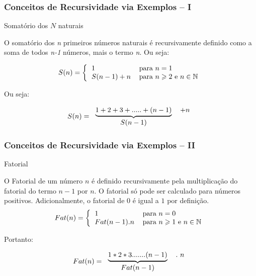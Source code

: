 \begin{frame}[fragile]

\frametitle{Conceitos de Recursividade via Exemplos -- I}

\begin{block}{Somatório dos $N$ naturais}

 O somatório dos \emph{n}  primeiros  números naturais é recursivamente 
 definido como a soma de todos \emph{n-1} números, mais o termo \emph{n}. 
 Ou seja:

    \[
    S(n)=\left \{
    \begin{tabular}
        [c]{ll}
        $1$ & para $n=1$ \\
        $S(n-1) + n $ & para $n \geqslant 2$ e $n \in \mathbb{N}$
    \end{tabular}
    \right.
    \]
    
    Ou seja:
    
    \[
    S(n)=
    \begin{tabular}[c]{cc}
        $\underbrace{1+2+3+.....+(n-1)}$ &  $  + n$\\
        $S(n-1)$ &
    \end{tabular}
    \]
\end{block}            

\end{frame}

\begin{frame}[fragile]
\frametitle{Conceitos de Recursividade via Exemplos -- II}


\begin{block}{Fatorial}

O Fatorial de um número $n$ é definido  recursivamente pela
 multiplicação do fatorial do termo $n-1$ por $n$. 
  O fatorial só pode ser calculado para números positivos. 
  Adicionalmente, o fatorial de $0$ é igual a 
  $1$ por definição.
    \[ 
    Fat(n)=\left\{
    \begin{tabular}[c]{ll}%
        $1$ & para $n = 0$\\
        $Fat(n-1) . n$ & para $n\geqslant1$ e $n \in \mathbb{N}$
    \end{tabular}
    \right.
    \]
    
    Portanto:
    
    \[
    Fat(n)=
    \begin{tabular}
        [c]{cc}%
        $\underbrace{1\ast2\ast3 . ..... . (n-1)}$ & $ .  \ n$\\
        $Fat(n-1)$ &
    \end{tabular}
    \]

\end{block}    
\end{frame}


